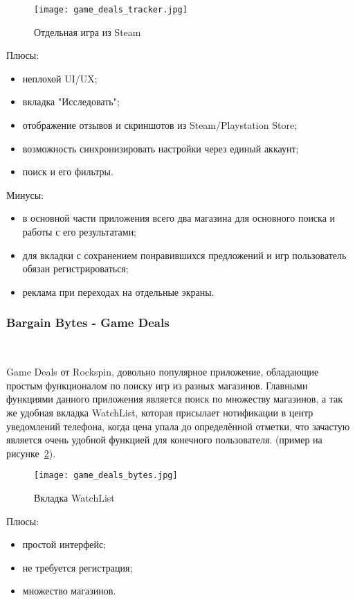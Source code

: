 \begin{figure}[H]
 \centering
   \texttt{[image: game\_deals\_tracker.jpg]} 
   \caption{Отдельная игра из Steam}
   \label{fig:domain:game_deals_tracker}
\end{figure}
 
Плюсы:
\begin{itemize}
 \item неплохой UI/UX;
 \item вкладка "Исследовать";
 \item отображение отзывов и скриншотов из Steam/Playstation Store;
 \item возможность синхронизировать настройки через единый аккаунт;
 \item поиск и его фильтры.
\end{itemize}
 
Минусы:
\begin{itemize}
 \item в основной части приложения всего два магазина для основного поиска и работы с его результатами;
 \item для вкладки с сохранением понравившихся предложений и игр пользователь обязан регистрироваться;
 \item реклама при переходах на отдельные экраны.
\end{itemize}
 
\subsubsection{Bargain Bytes - Game Deals}~\par
Game Deals от Rockspin, довольно популярное приложение, обладающие простым функционалом по поиску игр из разных магазинов. Главными функциями данного приложения является поиск по множеству магазинов, а так же удобная вкладка WatchList, которая присылает нотификации в центр уведомлений телефона, когда цена упала до определённой отметки, что зачастую является очень удобной функцией для конечного пользователя. (пример на рисунке~\ref{fig:domain:game_deals_bytes}).
 
\begin{figure}[H]
 \centering
   \texttt{[image: game\_deals\_bytes.jpg]} 
   \caption{Вкладка WatchList}
   \label{fig:domain:game_deals_bytes}
\end{figure}
 
Плюсы:
\begin{itemize}
 \item простой интерфейс;
 \item не требуется регистрация;
 \item множество магазинов.
\end{itemize}
 
